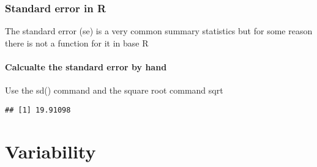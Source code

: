 \documentclass[
]{book}
\newenvironment{Shaded}{\begin{snugshade}}{\end{snugshade}}
\newcommand{\AttributeTok}[1]{\textcolor[rgb]{0.77,0.63,0.00}{#1}}
\newcommand{\DecValTok}[1]{\textcolor[rgb]{0.00,0.00,0.81}{#1}}
\newcommand{\FunctionTok}[1]{\textcolor[rgb]{0.00,0.00,0.00}{#1}}
\newcommand{\NormalTok}[1]{#1}
\newcommand{\SpecialCharTok}[1]{\textcolor[rgb]{0.00,0.00,0.00}{#1}}
\begin{document}
\begin{Shaded}
\end{Shaded}

\hypertarget{standard-error-in-r}{%
\subsection{Standard error in R}\label{standard-error-in-r}}

The standard error (se) is a very common summary statistics but for some reason
there is not a function for it in base R

\hypertarget{calcualte-the-standard-error-by-hand}{%
\subsubsection{Calcualte the standard error by hand}\label{calcualte-the-standard-error-by-hand}}

Use the sd() command and the square root command sqrt

\begin{Shaded}
\end{Shaded}

\begin{verbatim}
## [1] 19.91098
\end{verbatim}

\hypertarget{variability}{%
\chapter{Variability}\label{variability}}
\end{document}
